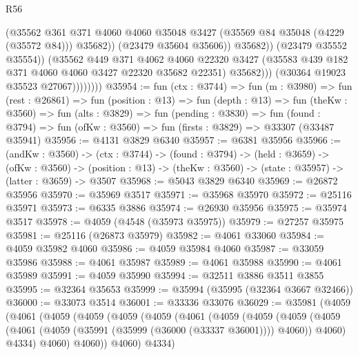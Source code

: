 \begin{lexlean}{R56}
\begin{coremodule}
                                (@35562
                                  @361
                                  @371
                                  @4060
                                  @4060
                                  @35048
                                  @3427
                                  (@35569 @84 @35048 (@4229 (@35572 @84)))
                                  @35682))
                              (@23479 @35604 @35606))
                            @35682))
                        (@23479 @35552 @35554))
                      (@35562
                        @449
                        @371
                        @4062
                        @4060
                        @22320
                        @3427
                        (@35583 @439 @182 @371 @4060 @4060 @3427 @22320 @35682 @22351)
                        @35682)))
                  (@30364 @19023 @35523 @27067))))))))
@35954 := fun (ctx : @3744) =>
  fun (m : @3980) =>
  fun (rest : @26861) =>
  fun (position : @13) =>
  fun (depth : @13) =>
  fun (theKw : @3560) =>
  fun (alts : @3829) =>
  fun (pending : @3830) =>
  fun (found : @3794) => fun (ofKw : @3560) => fun (firsts : @3829) => @33307 (@33487 @35941)
@35956 := @4131 @3829 @6340
@35957 := @6381 @35956
@35966 := (andKw : @3560) ->
  (ctx : @3744) ->
  (found : @3794) ->
  (held : @3659) ->
  (ofKw : @3560) ->
  (position : @13) -> (theKw : @3560) -> (state : @35957) -> (latter : @3659) -> @3507
@35968 := @5043 @3829 @6340
@35969 := @26872 @35956
@35970 := @35969 @3517
@35971 := @35968 @35970
@35972 := @25116 @35971
@35973 := @6335 @3886
@35974 := @26930 @35956
@35975 := @35974 @3517
@35978 := @4059 (@4548 (@35973 @35975))
@35979 := @27257 @35975
@35981 := @25116 (@26873 @35979)
@35982 := @4061 @33060
@35984 := @4059 @35982 @4060
@35986 := @4059 @35984 @4060
@35987 := @33059 @35986
@35988 := @4061 @35987
@35989 := @4061 @35988
@35990 := @4061 @35989
@35991 := @4059 @35990
@35994 := @32511 @3886 @3511 @3855
@35995 := @32364 @35653
@35999 := @35994 (@35995 (@32364 @3667 @32466))
@36000 := @33073 @3514
@36001 := @33336 @33076
@36029 := @35981
    (@4059
      (@4061
        (@4059
          (@4059
            (@4059
              (@4059
                (@4061
                  (@4059
                    (@4059
                      (@4059
                        (@4059
                          (@4061 (@4059 (@35991 (@35999 (@36000 (@33337 @36001)))) @4060))
                          @4060)
                        @4334)
                      @4060)
                    @4060))
                @4060)
              @4334)

\end{coremodule}
\end{lexlean}
